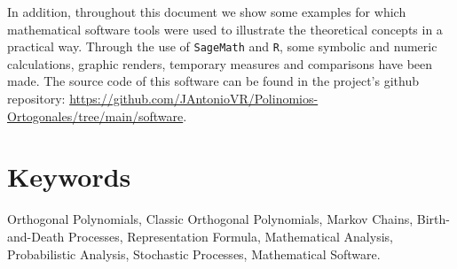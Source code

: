 In addition, throughout this document we show some examples for which mathematical software tools were used to illustrate the theoretical concepts in a practical way. Through the use of \texttt{SageMath} and \texttt{R}, some symbolic and numeric calculations, graphic renders, temporary measures and comparisons have been made. The source code of this software can be found in the project's github repository: \url{https://github.com/JAntonioVR/Polinomios-Ortogonales/tree/main/software}.



\section*{Keywords}

Orthogonal Polynomials, Classic Orthogonal Polynomials, Markov Chains, Birth-and-Death Processes, Representation Formula, Mathematical Analysis, Probabilistic Analysis, Stochastic Processes, Mathematical Software.